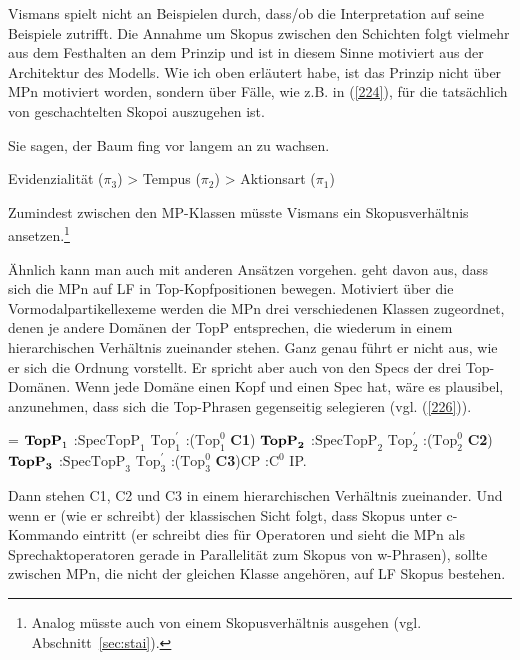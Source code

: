 Vismans spielt nicht an Beispielen durch, dass/ob die Interpretation auf seine Beispiele zutrifft. Die Annahme um Skopus zwischen den Schichten folgt vielmehr aus dem Festhalten an dem Prinzip und ist in diesem Sinne motiviert aus der Architektur des Modells. Wie ich oben erläutert habe, ist das Prinzip nicht über MPn motiviert worden, sondern über Fälle, wie z.B. in (\ref{224}), für die tatsächlich von geschachtelten Skopoi auszugehen ist.

\begin{exe}
	\ex\label{224} 
	Sie sagen, der Baum fing vor langem an zu wachsen.
\end{exe}
\vspace{-0.65cm}
\begin{exe}
	\ex\label{225} 
	Evidenzialität ($\pi_{\textrm{3}}$) > Tempus ($\pi_{\textrm{2}}$) > Aktionsart ($\pi_{\textrm{1}}$)
\end{exe}
Zumindest zwischen den MP-Klassen müsste Vismans ein Skopusverhältnis  ansetzen.\footnote{Analog müsste auch \citet{Ickler1994} von einem Skopusverhältnis ausgehen (vgl. Abschnitt~\ref{sec:stai}).}

Ähnlich kann man auch mit anderen Ansätzen vorgehen. \citet{Abraham1995} geht davon aus, dass sich die MPn auf LF in Top-Kopfpositionen bewegen. Motiviert über die Vormodalpartikellexeme  werden die MPn drei verschiedenen Klassen zugeordnet, denen je andere Domänen der TopP entsprechen, die wiederum in einem hierarchischen Verhältnis zueinander stehen. Ganz genau führt er nicht aus, wie er sich die Ordnung vorstellt. Er spricht aber auch von den Specs der drei Top-Domänen. Wenn jede Domäne einen Kopf und einen Spec hat, wäre es plausibel, anzunehmen, dass sich die Top-Phrasen gegenseitig selegieren (vgl. (\ref{226})).

\begin{exe}
	\ex\label{226}   
\begin{jtree}
\! = {$\textrm{\textbf{TopP}}_{1}$}
:{$\textrm{SpecTopP}_{1}$} {$\textrm{Top}^{\prime}_{1}$}
:({$\textrm{Top}^{0}_{1}$} {\textbf{C1}}) {$\textrm{\textbf{TopP}}_{\textbf{2}}$}
:{$\textrm{SpecTopP}_{2}$} {$\textrm{Top}^{\prime}_{2}$}
:({$\textrm{Top}^{0}_{2}$} {\textbf{\textbf{C2}}}) {$\textrm{\textbf{TopP}}_{\textbf{3}}$}
:{$\textrm{SpecTopP}_{3}$} {$\textrm{Top}^{\prime}_{3}$}
:({${\textrm{Top}^{0}_{3}}$} {\textbf{C3}}){CP}
:{$\textrm{C}^{0}$} {IP}.
\end{jtree}
\end{exe}
Dann stehen C1, C2 und C3 in einem hierarchischen Verhältnis zueinander. Und wenn er (wie er schreibt) der klassischen Sicht folgt, dass Skopus  unter c-Komman\-do  eintritt (er schreibt dies für Operatoren und sieht die MPn als Sprechaktope\-ratoren gerade in Parallelität zum Skopus von w-Phrasen), sollte zwischen MPn, die nicht der gleichen Klasse angehören, auf LF Skopus bestehen.

